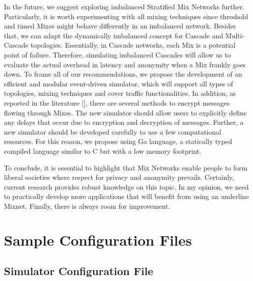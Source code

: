 \documentclass[logo,msc,cyber]{infthesis}   %
\begin{document}
In the future, we suggest exploring imbalanced Stratified Mix Networks further.
Particularly, it is worth experimenting with all mixing techniques since
threshold and timed Mixes might behave differently in an imbalanced network.
Besides that, we can adapt the dynamically imbalanced concept for Cascade and
Multi-Cascade topologies. Essentially, in Cascade networks, each Mix is a
potential point of failure. Therefore,  simulating imbalanced Cascades will
allow us to evaluate the actual overhead in latency and anonymity when a Mix
frankly goes down. To frame all of our recommendations, we propose
the development of an efficient and modular event-driven simulator, which will
support all types of topologies, mixing techniques and cover traffic
functionalities. In addition, as reported in the literature [], there are
several methods to encrypt messages flowing through Mixes. The new simulator
should allow users to explicitly define any delays that occur due to encryption
and decryption of messages. Further, a new simulator should be developed
carefully to use a few computational resources. For this reason, we propose
using Go language, a statically typed compiled language similar to C but with a
low memory footprint.

To conclude, it is essential to highlight that Mix Networks enable people to form
liberal societies where respect for privacy and anonymity prevails. Certainly,
current research provides robust knowledge on this topic. In my opinion, we need
to practically develop more applications that will benefit from using an
underline Mixnet. Finally, there is always room for improvement.





\appendix

\chapter{Sample Configuration Files}

\section{Simulator Configuration File}
\end{document}

